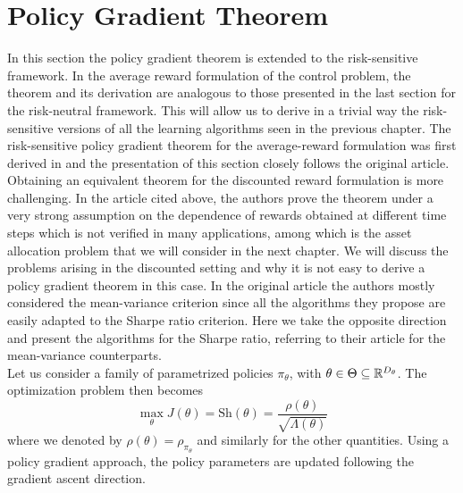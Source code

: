 \section{Policy Gradient Theorem}
In this section the policy gradient theorem is extended to the risk-sensitive framework. In the average reward formulation of the control problem, the theorem and its derivation are analogous to those presented in the last section for the risk-neutral framework. This will allow us to derive in a trivial way the risk-sensitive versions of all the learning algorithms seen in the previous chapter. The risk-sensitive policy gradient theorem for the average-reward formulation was first derived in \cite{prashanth2014actor} and the presentation of this section closely follows the original article. Obtaining an equivalent theorem for the discounted reward formulation is more challenging. In the article cited above, the authors prove the theorem under a very strong assumption on the dependence of rewards obtained at different time steps which is not verified in many applications, among which is the asset allocation problem that we will consider in the next chapter. We will discuss the problems arising in the discounted setting and why it is not easy to derive a policy gradient theorem in this case. In the original article the authors mostly considered the mean-variance criterion since all the algorithms they propose are easily adapted to the Sharpe ratio criterion. Here we take the opposite direction and present the algorithms for the Sharpe ratio, referring to their article for the mean-variance counterparts.\\   
Let us consider a family of parametrized policies $\pi_\theta$, with $\theta
\in \Theta \subseteq \mathbb{R}^{D_\theta}$. The optimization problem then becomes
\begin{equation}
	\max_\theta J(\theta) =  \text{Sh}(\theta) = \frac{\rho(\theta)}{\sqrt{\Lambda(\theta)}}
\end{equation}
where we denoted by $\rho(\theta) = \rho_{\pi_\theta}$ and similarly for the other quantities. Using a policy gradient approach, the policy parameters are updated following the gradient ascent direction.

